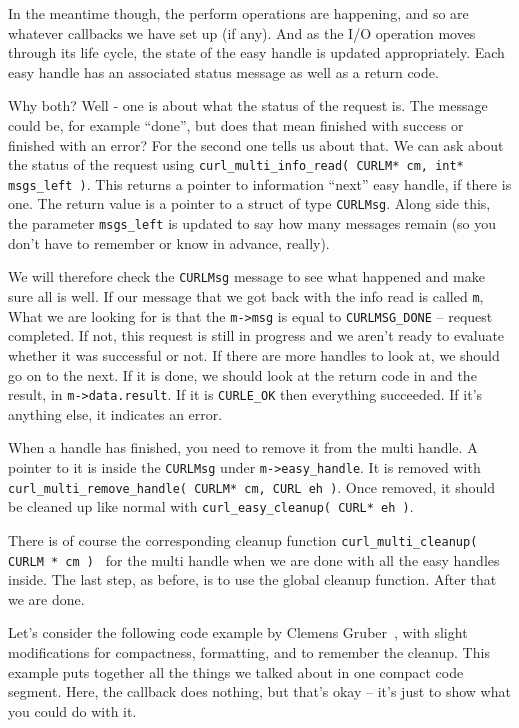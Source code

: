 \documentclass[a4paper]{report}
\begin{document}
In the meantime though, the perform operations are happening, and so are whatever callbacks we have set up (if any). And as the I/O operation moves through its life cycle, the state of the easy handle is updated appropriately. Each easy handle has an associated status message as well as a return code.

Why both? Well - one is about what the status of the request is. The message could be, for example ``done'', but does that mean finished with success or finished with an error? For the second one tells us about that. We can ask about the status of the request using \texttt{curl\_multi\_info\_read( CURLM* cm, int* msgs\_left )}. This returns a pointer to information ``next'' easy handle, if there is one. The return value is a pointer to a struct of type \texttt{CURLMsg}. Along side this, the parameter \texttt{msgs\_left} is updated to say how many messages remain (so you don't have to remember or know in advance, really).

We will therefore check the \texttt{CURLMsg} message to see what happened and make sure all is well. If our message that we got back with the info read is called \texttt{m}, What we are looking for is that the \texttt{m->msg} is equal to \texttt{CURLMSG\_DONE} -- request completed. If not, this request is still in progress and we aren't ready to evaluate whether it was successful or not. If there are more handles to look at, we should go on to the next. If it is done, we should look at the return code in and the result, in \texttt{m->data.result}. If it is \texttt{CURLE\_OK} then everything succeeded. If it's anything else, it indicates an error.

When a handle has finished, you need to remove it from the multi handle. A pointer to it is inside the \texttt{CURLMsg} under \texttt{m->easy\_handle}. It is removed with \texttt{curl\_multi\_remove\_handle( CURLM* cm, CURL eh )}. Once removed, it should be cleaned up like normal with \texttt{curl\_easy\_cleanup( CURL* eh )}.

There is of course the corresponding cleanup function \texttt{curl\_multi\_cleanup( CURLM * cm ) } for the multi handle when we are done with all the easy handles inside. The last step, as before, is to use the global cleanup function. After that we are done.

Let's consider the following code example by Clemens Gruber~\cite{curlmulti}, with slight modifications for compactness, formatting, and to remember the cleanup. This example puts together all the things we talked about in one compact code segment. Here, the callback does nothing, but that's okay -- it's just to show what you could do with it.
\end{document}
